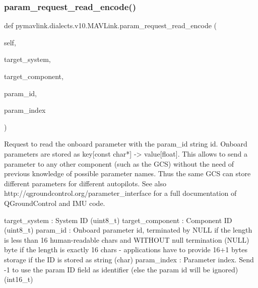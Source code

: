 \begin{DoxyVerb}
\begin{DoxyVerb}
\begin{DoxyVerb}
\begin{DoxyVerb}
\subsubsection{\texorpdfstring{param\+\_\+request\+\_\+read\+\_\+encode()}{param\_request\_read\_encode()}}
{\footnotesize\ttfamily def pymavlink.\+dialects.\+v10.\+M\+A\+V\+Link.\+param\+\_\+request\+\_\+read\+\_\+encode (\begin{DoxyParamCaption}\item[{}]{self,  }\item[{}]{target\+\_\+system,  }\item[{}]{target\+\_\+component,  }\item[{}]{param\+\_\+id,  }\item[{}]{param\+\_\+index }\end{DoxyParamCaption})}

\begin{DoxyVerb}Request to read the onboard parameter with the param_id string id.
Onboard parameters are stored as key[const char*] ->
value[float]. This allows to send a parameter to any
other component (such as the GCS) without the need of
previous knowledge of possible parameter names. Thus
the same GCS can store different parameters for
different autopilots. See also
http://qgroundcontrol.org/parameter_interface for a
full documentation of QGroundControl and IMU code.

target_system             : System ID (uint8_t)
target_component          : Component ID (uint8_t)
param_id                  : Onboard parameter id, terminated by NULL if the length is less than 16 human-readable chars and WITHOUT null termination (NULL) byte if the length is exactly 16 chars - applications have to provide 16+1 bytes storage if the ID is stored as string (char)
param_index               : Parameter index. Send -1 to use the param ID field as identifier (else the param id will be ignored) (int16_t)\end{DoxyVerb}
 \mbox{\label{classpymavlink_1_1dialects_1_1v10_1_1MAVLink_aa779f95800086fdff06728e8cb932076}} 

\end{DoxyVerb}
\end{DoxyVerb}
\end{DoxyVerb}
\end{DoxyVerb}
